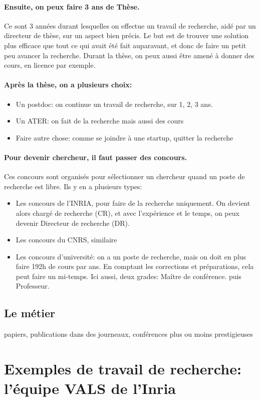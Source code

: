 \documentclass{article}
\begin{document}
\paragraph{Ensuite, on peux faire 3 ans de Thèse.} Ce sont 3 années durant lesquelles on effectue un travail de recherche, aidé par un directeur de thèse, sur un aspect bien précis. Le but est de trouver une solution plus efficace que tout ce qui avait été fait auparavant, et donc de faire un petit peu avancer la recherche. Durant la thèse, on peux aussi être amené à donner des cours, en licence par exemple.
\paragraph{Après la thèse, on a plusieurs choix:}
\begin{itemize}
	\item Un postdoc: on continue un travail de recherche, sur 1, 2, 3 ans.
	\item Un ATER: on fait de la recherche mais aussi des cours
	\item Faire autre chose: comme se joindre à une startup, quitter la recherche
\end{itemize}

\paragraph{Pour devenir chercheur, il faut passer des concours.} Ces concours sont organisés pour sélectionner un chercheur quand un poste de recherche est libre. Ils y en a plusieurs types: 
\begin{itemize}
	\item Les concours de l'INRIA, pour faire de la recherche uniquement. On devient alors chargé de recherche (CR), et avec l'expérience et le temps, on peux devenir Directeur de recherche (DR).
	\item Les concours du CNRS, similaire
	\item Les concours d'université: on a un poste de recherche, mais on doit en plus faire 192h de cours par ans. En comptant les corrections et préparations, cela peut faire un mi-temps. Ici aussi, deux grades: Maître de conférence. puis Professeur.
\end{itemize}

\subsection{Le métier}
papiers, publications dans des journeaux, conférences plus ou moins prestigieuses


\section{Exemples de travail de recherche: l'équipe VALS de l'Inria}

\section{}

\end{document}
